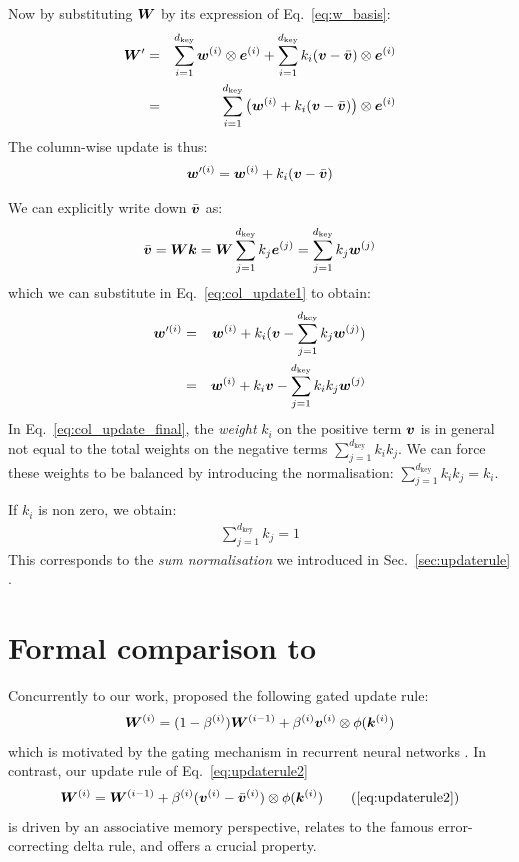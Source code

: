 \documentclass{article}
\theoremstyle{definition}
\begin{document}
Now by substituting ${\bm{W}}$ by its expression of Eq.~\ref{eq:w_basis}:
\begin{eqnarray}
{\bm{W}}' &=& \sum_{i=1}^{d_\text{key}} {\bm{w}}^{(i)}\otimes {\bm{e}}^{(i)}  + \sum_{i=1}^{d_\text{key}} k_i ({\bm{v}} - \bar{{\bm{v}}})  \otimes {\bm{e}}^{(i)}  \\
&=& \sum_{i=1}^{d_\text{key}} \big( {\bm{w}}^{(i)} +  k_i ({\bm{v}} - \bar{{\bm{v}}}) \big) \otimes {\bm{e}}^{(i)}
\end{eqnarray}
The column-wise update is thus: 
\begin{eqnarray}
{\bm{w}}'^{(i)} = {\bm{w}}^{(i)} +  k_i ({\bm{v}} - \bar{{\bm{v}}}) \label{eq:col_update1}
\end{eqnarray}

We can explicitly write down $\bar{{\bm{v}}}$ as:
\begin{eqnarray}
\bar{{\bm{v}}} = {\bm{W}} {\bm{k}} = {\bm{W}} \sum_{j=1}^{d_\text{key}} k_j {\bm{e}}^{(j)} = \sum_{j=1}^{d_\text{key}} k_j {\bm{w}}^{(j)}
\end{eqnarray}
which we can substitute in Eq.~\ref{eq:col_update1} to obtain:
\begin{eqnarray}
{\bm{w}}'^{(i)} &=& {\bm{w}}^{(i)} +  k_i ({\bm{v}} - \sum_{j=1}^{d_\text{key}} k_j {\bm{w}}^{(j)} ) \\
&=& {\bm{w}}^{(i)} +  k_i {\bm{v}} - \sum_{j=1}^{d_\text{key}} k_i k_j {\bm{w}}^{(j)} \label{eq:col_update_final}
\end{eqnarray}
In Eq.~\ref{eq:col_update_final}, the \textit{weight} $k_i$ on the positive term ${\bm{v}}$ is in general
not equal to the total weights on the negative terms $\sum_{j=1}^{d_\text{key}} k_i k_j$.
We can force these weights to be balanced by introducing the normalisation: $ \displaystyle \sum_{j=1}^{d_\text{key}} k_i k_j = k_i$.

If $k_i$ is non zero, we obtain: 
\begin{eqnarray*}
\sum_{j=1}^{d_\text{key}} k_j  = 1
\end{eqnarray*}
This corresponds to the \textit{sum normalisation} we introduced in Sec.~\ref{sec:updaterule} \qedsymbol.

\section{Formal comparison to \citet{peng2021random}}
\label{sec:peng}
Concurrently to our work, \citet{peng2021random} proposed the following gated update rule:
\begin{align}
{\bm{W}}^{(i)}= (1-\beta^{(i)}) {\bm{W}}^{(i-1)} + \beta^{(i)} {\bm{v}}^{(i)} \otimes \phi({\bm{k}}^{(i)})
\end{align}
which is motivated by the gating mechanism in recurrent neural networks \citep{hochreiter1997long}.
In contrast, our update rule of Eq.~\ref{eq:updaterule2} 
\begin{align}
\mW^{(i)}= \mW^{(i-1)} + \beta^{(i)}(\vv^{(i)} - \bar{\vv}^{(i)}) \otimes \phi(\vk^{(i)})  \tag{\ref{eq:updaterule2}}
\end{align}
is driven by an associative memory
perspective, relates to the famous error-correcting delta rule,
and offers a crucial property.
\end{document}
